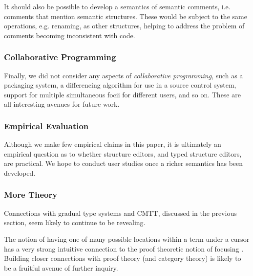 \documentclass[preprint,9pt]{sigplanconf}
\begin{document}
It should also be possible to develop a semantics of semantic comments, i.e. comments that mention semantic structures. These would be subject to the same operations, e.g. renaming, as other structures, helping to address the problem of comments becoming inconsistent with code.

\subsubsection{Collaborative Programming}
Finally, we did not consider any aspects of \emph{collaborative programming}, such as a packaging system, a differencing algorithm for use in a source control system, support for multiple simultaneous focii for different users, and so on. These are all interesting avenues for future work.

\subsubsection{Empirical Evaluation}
Although we make few empirical claims in this paper, it is ultimately an empirical question as to whether structure editors, and typed structure editors, are practical. We hope to conduct user studies once a richer semantics has been developed.

\subsubsection{More Theory}
Connections with gradual type systems and CMTT, discussed in the previous section, seem likely to continue to be revealing.

The notion of having one of many possible locations within a term under a cursor has a very strong intuitive connection to the proof theoretic notion of focusing \cite{Simmons11tr}. Building closer connections with proof theory (and category theory) is likely to be a fruitful avenue of further inquiry.






\end{document}
